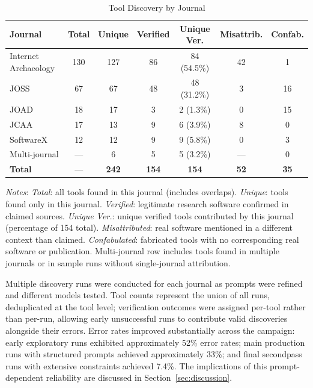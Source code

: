\begin{table}[h]
\centering
\caption{Tool Discovery by Journal}
\label{tab:discovery-by-journal}
\begin{tabular}{lcccccc}
\toprule
\textbf{Journal} & \textbf{Total} & \textbf{Unique} & \textbf{Verified} & \textbf{Unique Ver.} & \textbf{Misattrib.} & \textbf{Confab.} \\
\midrule
Internet Archaeology & 130 & 127 & 86 & 84 (54.5\%) & 42 & 1 \\
JOSS & 67 & 67 & 48 & 48 (31.2\%) & 3 & 16 \\
JOAD & 18 & 17 & 3 & 2 (1.3\%) & 0 & 15 \\
JCAA & 17 & 13 & 9 & 6 (3.9\%) & 8 & 0 \\
SoftwareX & 12 & 12 & 9 & 9 (5.8\%) & 0 & 3 \\
Multi-journal & --- & 6 & 5 & 5 (3.2\%) & --- & 0 \\
\midrule
\textbf{Total} & --- & \textbf{242} & \textbf{154} & \textbf{154} & \textbf{52} & \textbf{35} \\
\bottomrule
\end{tabular}
\smallskip
{\small \textit{Notes}: \textit{Total}: all tools found in this journal (includes overlaps). \textit{Unique}: tools found only in this journal. \textit{Verified}: legitimate research software confirmed in claimed sources. \textit{Unique Ver.}: unique verified tools contributed by this journal (percentage of 154 total). \textit{Misattributed}: real software mentioned in a different context than claimed. \textit{Confabulated}: fabricated tools with no corresponding real software or publication. Multi-journal row includes tools found in multiple journals or in sample runs without single-journal attribution.}
\end{table}

Multiple discovery runs were conducted for each journal as prompts were refined and different models tested. Tool counts represent the union of all runs, deduplicated at the tool level; verification outcomes were assigned per-tool rather than per-run, allowing early unsuccessful runs to contribute valid discoveries alongside their errors. Error rates improved substantially across the campaign: early exploratory runs exhibited approximately 52\% error rates; main production runs with structured prompts achieved approximately 33\%; and final secondpass runs with extensive constraints achieved 7.4\%. The implications of this prompt-dependent reliability are discussed in Section~\ref{sec:discussion}.

